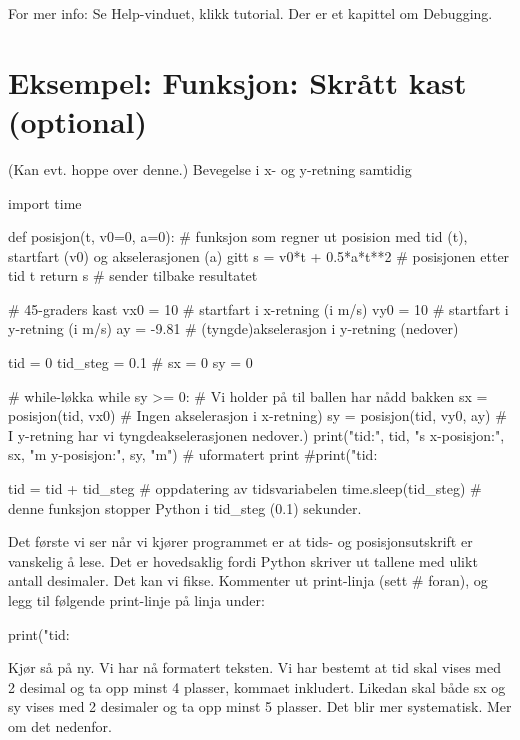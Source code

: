 For mer info: Se Help-vinduet, klikk tutorial. Der er et kapittel om Debugging.

\section {Eksempel: Funksjon: Skrått kast (optional)}

(Kan evt. hoppe over denne.)
Bevegelse i x- og y-retning samtidig

\begin{usncodebox}
import time

def posisjon(t, v0=0, a=0):    # funksjon som regner ut posision med tid (t), startfart (v0) og akselerasjonen (a) gitt
    s = v0*t + 0.5*a*t**2      # posisjonen etter tid t
    return s                   # sender tilbake resultatet
    

# 45-graders kast
vx0 = 10         # startfart i x-retning (i m/s)
vy0 = 10         # startfart i y-retning (i m/s)
ay = -9.81       # (tyngde)akselerasjon i y-retning (nedover)

tid = 0
tid_steg = 0.1   # 
sx = 0
sy = 0

# while-løkka
while sy >= 0:                    # Vi holder på til ballen har nådd bakken 
    sx = posisjon(tid, vx0)       # Ingen akselerasjon i x-retning) 
    sy = posisjon(tid, vy0, ay)   # I y-retning har vi tyngdeakselerasjonen nedover.)
    print("tid:", tid, "s   x-posisjon:", sx, "m   y-posisjon:", sy, "m")              # uformatert print
    #print("tid: %

    tid = tid + tid_steg          # oppdatering av tidsvariabelen
    time.sleep(tid_steg)          # denne funksjon stopper Python i tid_steg (0.1) sekunder. 
\end{usncodebox}

Det første vi ser når vi kjører programmet er at tids- og posisjonsutskrift er vanskelig å lese. Det er hovedsaklig fordi Python skriver ut tallene med ulikt antall desimaler. Det kan vi fikse. Kommenter ut print-linja (sett \# foran), og legg til følgende print-linje på linja under:

\begin{usncodebox}
print("tid: %
\end{usncodebox}

Kjør så på ny. Vi har nå formatert teksten. Vi har bestemt at tid skal vises med 2 desimal og ta opp minst 4 plasser, kommaet inkludert. Likedan skal både sx og sy vises med 2 desimaler og ta opp minst 5 plasser. Det blir mer systematisk. Mer om det nedenfor. 

